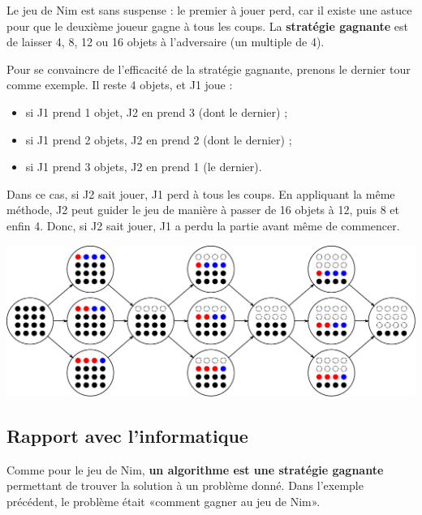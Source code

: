 \documentclass[a5paper,pagesize,DIV=14]{scrbook}
\begin{document}
Le jeu de Nim est sans suspense : le premier à jouer perd, car il existe une astuce pour que le deuxième joueur gagne à tous les coups. La \textbf{stratégie gagnante} est de laisser 4, 8, 12 ou 16 objets à l'adversaire (un multiple de 4).

Pour se convaincre de l'efficacité de la stratégie gagnante, prenons le dernier tour comme exemple. Il reste 4 objets, et J1 joue :

\begin{itemize}
  \item si J1 prend 1 objet, J2 en prend 3 (dont le dernier) ;
  \item si J1 prend 2 objets, J2 en prend 2 (dont le dernier) ;
  \item si J1 prend 3 objets, J2 en prend 1 (le dernier).
\end{itemize}        

Dans ce cas, si J2 sait jouer, J1 perd à tous les coups. En appliquant la même méthode, J2 peut guider le jeu de manière à passer de 16 objets à 12, puis 8 et enfin 4. Donc, si J2 sait jouer, J1 a perdu la partie avant même de commencer.

\begin{center}
  \includegraphics[width=\linewidth]{img/nim16.pdf}
\end{center}

\subsection*{Rapport avec l'informatique}

Comme pour le jeu de Nim, \textbf{un algorithme est une stratégie gagnante} permettant de trouver la solution à un problème donné. Dans l'exemple précédent, le problème était «comment gagner au jeu de Nim».

\end{document}
